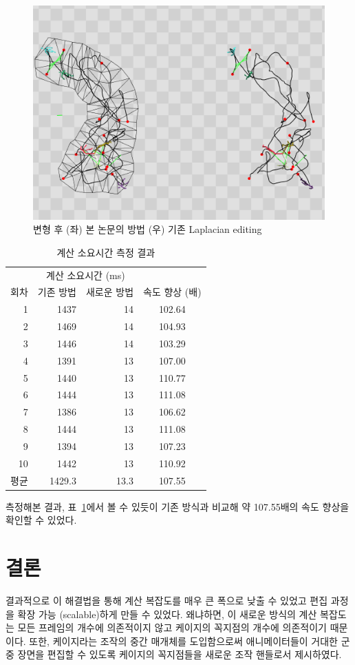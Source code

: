 \documentclass[11pt,a4paper,oneside,draft]{report}
\begin{document}
\begin{figure}[p]
\centering
\includegraphics[width=0.9\linewidth]{after_deform_c.png}
\caption{변형 후 (좌) 본 논문의 방법 (우) 기존 Laplacian editing}
\label{fig:after_deform}
\end{figure}

\begin{table}[ht]
\centering
\begin{tabular}{r*{2}{r}c}
\hline
 & \multicolumn{2}{c}{계산 소요시간 (ms)} & \\
\cline{2-3}
회차 & 기존 방법 & 새로운 방법 & 속도 향상 (배) \\
\hline
1 & 1437 & 14 & 102.64 \\
2 & 1469 & 14 & 104.93 \\
3 & 1446 & 14 & 103.29 \\
4 & 1391 & 13 & 107.00 \\
5 & 1440 & 13 & 110.77 \\
6 & 1444 & 13 & 111.08 \\
7 & 1386 & 13 & 106.62 \\
8 & 1444 & 13 & 111.08 \\
9 & 1394 & 13 & 107.23 \\
10 & 1442 & 13 & 110.92 \\
\hline
평균 & 1429.3 & 13.3 & 107.55 \\
\hline
\end{tabular}
\caption{계산 소요시간 측정 결과}
\label{table:result}
\end{table}

측정해본 결과, 표~\ref{table:result}에서 볼 수 있듯이 기존 방식과 비교해 약
107.55배의 속도 향상을 확인할 수 있었다.

\chapter{결론}
결과적으로 이 해결법을 통해 계산 복잡도를 매우 큰 폭으로 낮출 수 있었고 편집
과정을 확장 가능 (scalable)하게 만들 수 있었다. 왜냐하면, 이 새로운 방식의 계산
복잡도는 모든 프레임의 개수에 의존적이지 않고 케이지의 꼭지점의 개수에
의존적이기 때문이다. 또한, 케이지라는 조작의 중간 매개체를 도입함으로써
애니메이터들이 거대한 군중 장면을 편집할 수 있도록 케이지의 꼭지점들을 새로운
조작 핸들로서 제시하였다.
\end{document}
